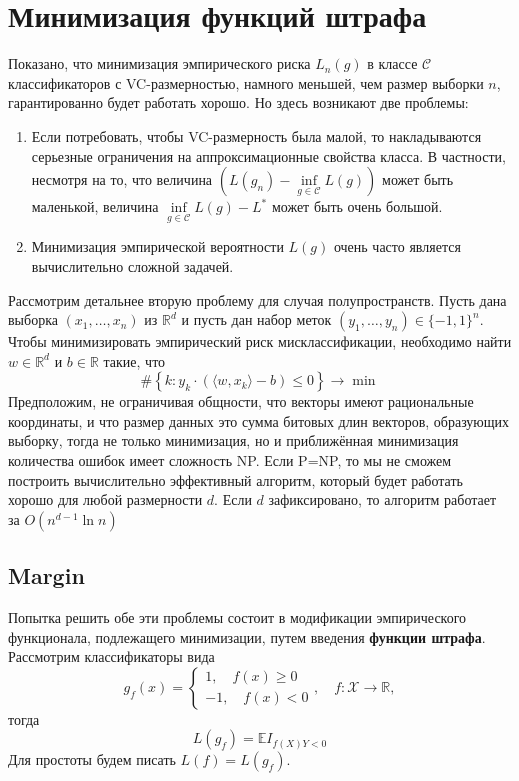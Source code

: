 \documentclass[12pt]{article}
\begin{document}
\section{Минимизация функций штрафа}
Показано, что минимизация эмпирического риска $L_n(g)$ в классе $\mathcal{C}$ классификаторов с VC-размерностью, намного меньшей, чем размер выборки $n$, гарантированно будет работать хорошо. Но здесь возникают две проблемы:
\begin{enumerate}
	\item Если потребовать, чтобы VC-размерность была малой, то накладываются серьезные ограничения на аппроксимационные свойства класса. В частности, несмотря на то, что величина  $(L(g_n)-\inf\limits_{g\in\mathcal{C}}L(g))$ может быть маленькой, величина $\inf\limits_{g\in\mathcal{C}}L(g)-L^*$ может быть очень большой. 
	\item Минимизация эмпирической вероятности $L(g)$ очень часто является вычислительно сложной задачей.
\end{enumerate}
Рассмотрим детальнее вторую проблему для случая полупространств. Пусть дана выборка $(x_1,\dots, x_n)$ из $\mathbb{R}^d$ и пусть дан набор меток $(y_1,\dots, y_n)\in\{-1,1\}^n$. Чтобы минимизировать эмпирический риск мисклассификации, необходимо найти $w\in\mathbb{R}^d$ и $b\in\mathbb{R}$ такие, что
\begin{equation*}
	\#\left\{k:y_k\cdot(\langle w,x_k\rangle-b) \leqslant0\right\}\to\min
\end{equation*}
Предположим, не ограничивая общности, что векторы имеют рациональные координаты, и что размер данных это сумма битовых длин векторов, образующих выборку, тогда не только минимизация, но и приближённая минимизация количества ошибок имеет сложность NP. Если P=NP, то мы не сможем построить вычислительно эффективный алгоритм, который будет работать хорошо для любой размерности $d$. Если $d$ зафиксировано, то алгоритм работает за $O(n^{d-1}\ln n)$
\subsection{Margin}
Попытка решить обе эти проблемы состоит в модификации эмпирического функционала, подлежащего минимизации, путем введения \textbf{функции штрафа}. Рассмотрим классификаторы вида
\begin{equation*}
	g_f(x)=\begin{cases}
		1, \quad f(x)\geqslant0\\
		-1, \quad f(x)<0
	\end{cases}
	, \quad f:\mathcal{X}\to\mathbb{R},
\end{equation*}
тогда
\begin{equation*}
	L(g_f)=\mathbb{E}I_{f(X)Y<0}
\end{equation*}
Для простоты будем писать $L(f)=L(g_f)$.
\end{document}
